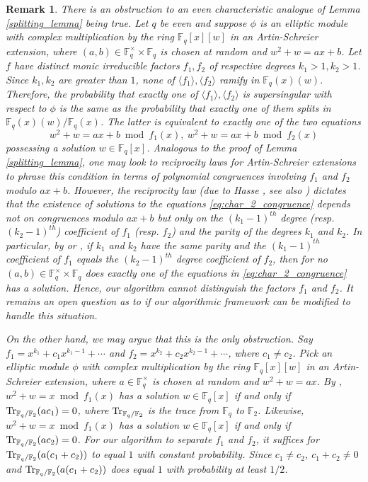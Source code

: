 \documentclass[12pt]{article}
\newtheorem{remark}{Remark}
\def\F{\ensuremath{\mathbb{F}}}
\begin{document}
\begin{remark} \label{rk:obstruction}
There is an obstruction to an even characteristic analogue of Lemma
\ref{splitting_lemma} being true. Let $q$ be even and suppose $\phi$
is an elliptic module with complex multiplication by the ring
$\F_q[x][w]$ in an Artin-Schreier extension, where $(a,b) \in
\F_q^\times \times \F_q$ is chosen at random and $w^2+w=ax+b$. Let $f$
have distinct monic irreducible factors $f_1,f_2$ of respective
degrees $k_1>1,k_2>1$.  Since $k_1,k_2$ are greater than $1$, none of
$\langle f_1\rangle, \langle f_2\rangle$ ramify in
$\F_q(x)(w)$. Therefore, the probability that exactly one of $\langle
f_1\rangle, \langle f_2\rangle$ is supersingular with respect to
$\phi$ is the same as the probability that exactly one of them splits
in $\F_q(x)(w)/\F_q(x)$. The latter is equivalent to exactly one of
the two equations
\begin{equation}\label{eq:char_2_congruence}
  w^2+w = ax+b \bmod f_1(x),\ w^2+w = ax+b \bmod f_2(x)
\end{equation}
possessing a solution $w \in \F_q[x]$. Analogous to the proof of Lemma
\ref{splitting_lemma}, one may look to reciprocity laws for
Artin-Schreier extensions to phrase this condition in terms of
polynomial congruences involving $f_1$ and $f_2$ modulo
$ax+b$. However, the reciprocity law (due to Hasse \cite{Hasse34}, see
also \cite[Theorem 4.2]{Conrad}) dictates that the existence of
solutions to the equations \eqref{eq:char_2_congruence} depends not on
congruences modulo $ax+b$ but only on the $(k_1-1)^{th}$ degree
(resp. $(k_2-1)^{th}$) coefficient of $f_1$ (resp. $f_2$) and the
parity of the degrees $k_1$ and $k_2$. In particular, by
\cite[Theorem~4.2]{Conrad} or \cite[Example~4.1]{Conrad}, if $k_1$ and
$k_2$ have the same parity and the $(k_1-1)^{th}$ coefficient of $f_1$
equals the $(k_2-1)^{th}$ degree coefficient of $f_2$, then for no
$(a,b) \in \F_q^\times \times \F_q$ does exactly one of the equations
in \eqref{eq:char_2_congruence} has a solution. Hence, our algorithm
cannot distinguish the factors $f_1$ and $f_2$. It remains an open
question as to if our algorithmic framework can be modified to handle
this situation. 

On the other hand, we may argue that this is the only obstruction. Say
$f_1 = x^{k_1}+c_1x^{k_1-1}+\cdots$ and $f_2 =
x^{k_2}+c_2x^{k_2-1}+\cdots$, where $c_1 \neq c_2$. Pick an elliptic
module $\phi$ with complex multiplication by the ring $\F_q[x][w]$ in
an Artin-Schreier extension, where $a \in \F_q^\times$ is chosen at
random and $w^2+w=ax$. By \cite[Example 4.1]{Conrad}, $w^2+w = x \bmod
f_1(x)$ has a solution $w \in \F_q[x]$ if and only if
${\rm Tr}_{\F_q/\F_2}(ac_1) = 0$, where ${\rm Tr}_{\F_q/\F_2}$ is the trace from
$\F_q$ to $\F_2$. Likewise, $w^2+w = x \bmod f_1(x)$ has a solution $w
\in \F_q[x]$ if and only if ${\rm Tr}_{\F_q/\F_2}(ac_2) = 0$. For our
algorithm to separate $f_1$ and $f_2$, it suffices for
${\rm Tr}_{\F_q/\F_2}(a(c_1+c_2))$ to equal $1$ with constant
probability. Since $c_1 \neq c_2$, $c_1+c_2 \neq 0$ and
${\rm Tr}_{\F_q/\F_2}(a(c_1+c_2))$ does equal $1$ with probability at least
$1/2$.
\end{remark}
\end{document}
